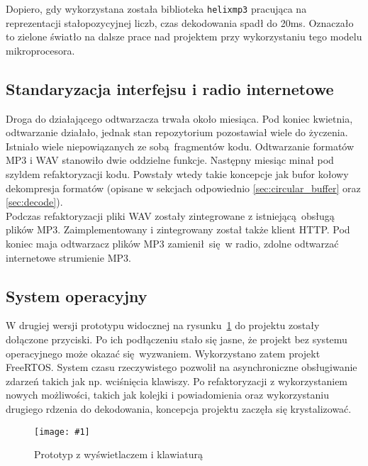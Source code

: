\documentclass[polish]{aghengthesis}
\newcommand{\imgint}[4]{
	\begin{figure}[{#4}]
		\centering
		\texttt{[image: \#1]}
		\caption{#2}
		\label{#1}
	\end{figure}
}
\newcommand{\imgh}[3]{\imgint{#1}{#2}{#3}{H}}
\newcommand{\lstfile}[3]{
	\noindent
	\hspace{0.1\linewidth}
	\begin{minipage}{0.8\linewidth}
		
	\end{minipage}
	\vspace{0.3cm}
}
\begin{document}
			\lstfile{c}{Pomiar czasu dekodowania ramki MP3}{lst/4/benchmark.c}
			
			Dopiero, gdy wykorzystana została biblioteka \lstinline|helixmp3| pracująca na reprezentacji stałopozycyjnej liczb, czas dekodowania spadł do 20ms. Oznaczało to zielone światło na dalsze prace nad projektem przy wykorzystaniu tego modelu mikroprocesora.
			
		\subsection{Standaryzacja interfejsu i radio internetowe}
			Droga do działającego odtwarzacza trwała około miesiąca. Pod koniec kwietnia, odtwarzanie działało, jednak stan repozytorium pozostawiał wiele do życzenia. Istniało wiele niepowiązanych ze sobą fragmentów kodu. Odtwarzanie formatów MP3 i WAV stanowiło dwie oddzielne funkcje. Następny miesiąc minał pod szyldem refaktoryzacji kodu. Powstały wtedy takie koncepcje jak bufor kołowy dekompresja formatów (opisane w sekcjach odpowiednio \ref{sec:circular_buffer} oraz \ref{sec:decode}).
			$ $\\
			
			Podczas refaktoryzacji pliki WAV zostały zintegrowane z istniejącą obsługą plików MP3. Zaimplementowany i zintegrowany został także klient HTTP. Pod koniec maja odtwarzacz plików MP3 zamienił się w radio, zdolne odtwarzać internetowe strumienie MP3.
			
		\subsection{System operacyjny}
			W drugiej wersji prototypu widocznej na rysunku~\ref{4/prototype_2} do projektu zostały dołączone przyciski.
			Po ich podłączeniu stało się jasne, że projekt bez systemu operacyjnego może okazać się wyzwaniem. Wykorzystano zatem projekt FreeRTOS. System czasu rzeczywistego pozwolił na asynchroniczne obsługiwanie zdarzeń takich jak np. wciśnięcia klawiszy. Po refaktoryzacji z wykorzystaniem nowych możliwości, takich jak kolejki i powiadomienia oraz wykorzystaniu drugiego rdzenia do dekodowania, koncepcja projektu zaczęła się krystalizować.
			
			\imgh{4/prototype_2}{Prototyp z wyświetlaczem i klawiaturą}{0.8}
			
\end{document}
